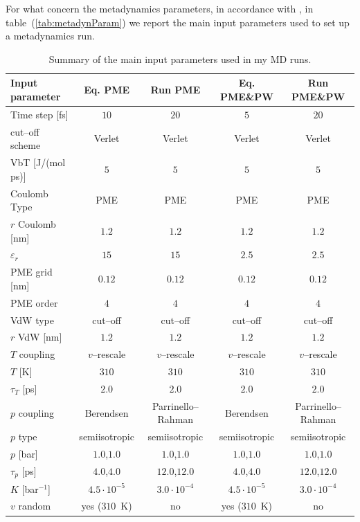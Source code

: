 For what concern the metadynamics parameters, in accordance with \cite{ourPaper}, in table~(\ref{tab:metadynParam}) we report the main input parameters used to set up a metadynamics run.

\begin{table}[h!t]
	\centering\footnotesize
	\begin{tabular}{lcccc}
		\toprule
		Input parameter & Eq. \acs{PME} & Run \acs{PME} & Eq. \acs{PME}\&\acs{PW} & Run \acs{PME}\&\acs{PW} \\ \toprule
		Time step [fs]		&	$10$ & $20$ & $5$ & $20$ \\ \midrule
		cut--off scheme		& Verlet & Verlet & Verlet & Verlet \\ \midrule
		VbT [J/(mol ps)]	& $5$ & $5$ & $5$ & $5$ \\ \midrule
		Coulomb Type		& \acs{PME}	& \acs{PME}	& \acs{PME} & \acs{PME} \\ \midrule
		$r$ Coulomb	[nm]	& $1.2$ & $1.2$ & $1.2$ & $1.2$ \\ \midrule
		$\varepsilon_r$		& $15$ & $15$ & $2.5$ & $2.5$ \\ \midrule
		\acs{PME} grid [nm]	& $0.12$ & $0.12$ & $0.12$ & $0.12$ \\ \midrule
	    \acs{PME} order		& $4$ & $4$ & $4$ & $4$ \\ \midrule
		VdW type			& cut--off & cut--off & cut--off & cut--off \\ \midrule
		$r$ VdW [nm]		& $1.2$ & $1.2$ & $1.2$ & $1.2$ \\ \midrule
		$T$ coupling		& $v$--rescale & $v$--rescale & $v$--rescale & $v$--rescale \\ \midrule
		$T$ [K]				& $310$ & $310$ & $310$ & $310$  \\ \midrule
		$\tau_T$ [ps]		& $2.0$ & $2.0$ & $2.0$ & $2.0$ \\ \midrule
		$p$ coupling		& Berendsen & Parrinello--Rahman & Berendsen & Parrinello--Rahman \\ \midrule
		$p$ type			& semiisotropic & semiisotropic & semiisotropic & semiisotropic \\ \midrule
		$p$ [bar]			& $1.0$,$1.0$ & $1.0$,$1.0$ & $1.0$,$1.0$ & $1.0$,$1.0$ \\ \midrule
		$\tau_p$ [ps]		& $4.0$,$4.0$ & $12.0$,$12.0$ & $4.0$,$4.0$ & $12.0$,$12.0$ \\ \midrule
		$K$ [bar$^{-1}$]	& $4.5\cdot 10^{-5}$ & $3.0\cdot 10^{-4}$ & $4.5\cdot 10^{-5}$ & $3.0\cdot 10^{-4}$ \\ \midrule
		$v$ random			& yes ($310$~K) & no & yes ($310$~K) & no \\ \bottomrule 
	\end{tabular}
	\caption{Summary of the main input parameters used in my \acs{MD} runs.}
	\label{tab:inputParam}
\end{table}

